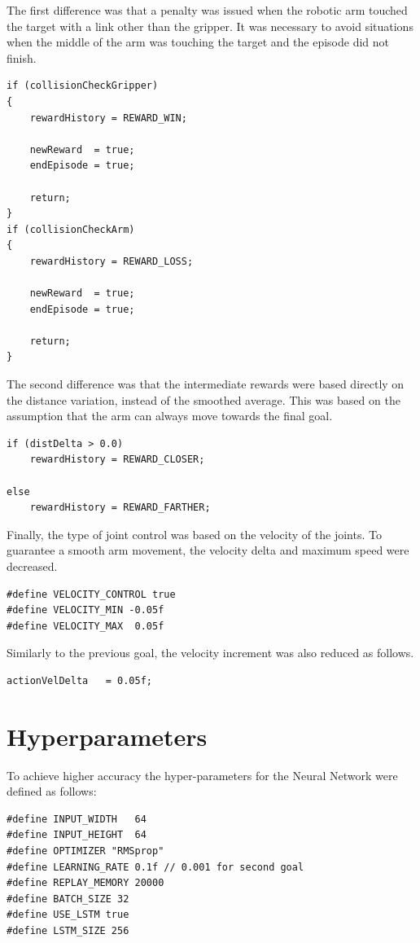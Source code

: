 \documentclass[10pt,journal,compsoc]{IEEEtran}
\begin{document}
The first difference was that a penalty was issued when the robotic arm touched the target with a link other than the gripper. It was necessary to avoid situations when the middle of the arm was touching the target and the episode did not finish. 
\begin{lstlisting}
if (collisionCheckGripper)
{
	rewardHistory = REWARD_WIN;
	
	newReward  = true;
	endEpisode = true;

	return;
}
if (collisionCheckArm)
{
	rewardHistory = REWARD_LOSS;
	
	newReward  = true;
	endEpisode = true;

	return;
}
\end{lstlisting}


The second difference was that the intermediate rewards were based directly on the distance variation, instead of the smoothed average. This was based on the assumption that the arm can always move towards the final goal. 
\begin{lstlisting}
if (distDelta > 0.0)
	rewardHistory = REWARD_CLOSER;
	
else
	rewardHistory = REWARD_FARTHER;
\end{lstlisting}

Finally, the type of joint control was based on the velocity of the joints. To guarantee a smooth arm movement, the velocity delta and maximum speed were decreased.
\begin{lstlisting}
#define VELOCITY_CONTROL true	
#define VELOCITY_MIN -0.05f
#define VELOCITY_MAX  0.05f
\end{lstlisting}

Similarly to the previous goal, the velocity increment was also reduced as follows. 
\begin{lstlisting}
actionVelDelta   = 0.05f;
\end{lstlisting}


\section{Hyperparameters}

To achieve higher accuracy the hyper-parameters for the Neural Network were defined as follows:
\begin{lstlisting}
#define INPUT_WIDTH   64
#define INPUT_HEIGHT  64
#define OPTIMIZER "RMSprop"
#define LEARNING_RATE 0.1f // 0.001 for second goal
#define REPLAY_MEMORY 20000
#define BATCH_SIZE 32	
#define USE_LSTM true
#define LSTM_SIZE 256
\end{lstlisting}
\end{document}

